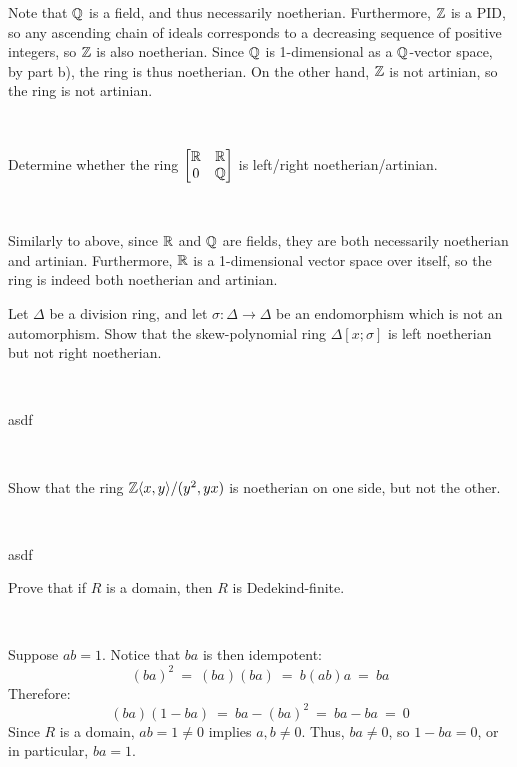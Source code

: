 \begin{pf}
	Note that $\mathbb{Q}$ is a field, and thus necessarily noetherian.
	Furthermore, $\mathbb{Z}$ is a PID, so any ascending chain of ideals
	corresponds to a decreasing sequence of positive integers,
	so $\mathbb{Z}$ is also noetherian.
	Since $\mathbb{Q}$ is 1-dimensional as a $\mathbb{Q}$-vector space,
	by part b), the ring is thus noetherian.
	On the other hand, $\mathbb{Z}$ is not artinian, so the ring is not artinian.
\end{pf} \

\begin{exr}
	Determine whether the ring
	$\begin{bmatrix} \mathbb{R} & \mathbb{R} \\ 0 & \mathbb{Q} \end{bmatrix}$
	is left/right noetherian/artinian.
\end{exr} \

\begin{pf}
	Similarly to above, since $\mathbb{R}$ and $\mathbb{Q}$ are fields, they are both
	necessarily noetherian and artinian.
	Furthermore, $\mathbb{R}$ is a 1-dimensional vector space over itself, so
	the ring is indeed both noetherian and artinian.
\end{pf}


\nq
\begin{exr}[title=Example 1.25] %
	Let $\Delta$ be a division ring, and let $\sigma:\Delta\rightarrow\Delta$ be an endomorphism
	which is not an automorphism.
	Show that the skew-polynomial ring $\Delta[x;\sigma]$ is left noetherian
	but not right noetherian.
\end{exr} \

\begin{pf}
	asdf
\end{pf} \

\begin{exr}[title=Example 1.26] %
	Show that the ring $\mathbb{Z}\langle x,y\rangle /(y^2,yx)$ is noetherian on
	one side, but not the other.
\end{exr} \

\begin{pf}
	asdf
\end{pf}


\nq
\begin{exr}[title=Exercise 1.4(c)]
	Prove that if $R$ is a domain, then $R$ is Dedekind-finite.
\end{exr} \

\begin{pf}
	Suppose $ab=1$. Notice that $ba$ is then idempotent:
	\begin{equation*}
		(ba)^{2} \ = \ (ba)(ba) \ = \ b(ab)a \ = \ ba
	\end{equation*}
	Therefore:
	\begin{equation*}
		(ba)(1-ba) \ = \ ba-(ba)^{2} \ = \ ba-ba \ = \ 0
	\end{equation*}
	Since $R$ is a domain, $ab=1\neq0$ implies $a,b\neq0$.
	Thus, $ba\neq0$, so $1-ba=0$, or in particular, $ba=1$.
\end{pf} \

